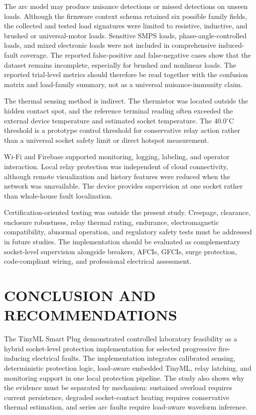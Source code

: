 \documentclass[conference,a4paper]{template/IEEEtran}
\begin{document}
The arc model may produce nuisance detections or missed detections on
unseen loads. Although the firmware context schema retained six possible
family fields, the collected and tested load signatures were limited to
resistive, inductive, and brushed or universal-motor loads. Sensitive
SMPS loads, phase-angle-controlled loads, and mixed electronic loads were
not included in comprehensive induced-fault coverage. The reported
false-positive and false-negative cases show that the dataset remains incomplete,
especially for brushed and nonlinear loads. The reported trial-level
metrics should therefore be read together with the confusion matrix and
load-family summary, not as a universal nuisance-immunity claim.

The thermal sensing method is indirect. The thermistor was located
outside the hidden contact spot, and the reference terminal reading often
exceeded the external device temperature and estimated socket
temperature. The 40.0$^{\circ}$C threshold is a prototype control
threshold for conservative relay action rather than a universal socket
safety limit or direct hotspot measurement.

Wi-Fi and Firebase supported monitoring, logging, labeling, and operator
interaction. Local relay protection was independent of cloud
connectivity, although remote visualization and history features were
reduced when the network was unavailable. The device provides supervision
at one socket rather than whole-house fault localization.

Certification-oriented testing was outside the present study. Creepage,
clearance, enclosure robustness, relay thermal rating, endurance,
electromagnetic compatibility, abnormal operation, and regulatory safety
tests must be addressed in future studies. The implementation should be
evaluated as
complementary socket-level supervision alongside breakers, AFCIs, GFCIs,
surge protection, code-compliant wiring, and professional electrical
assessment.

\section{CONCLUSION AND RECOMMENDATIONS}

The TinyML Smart Plug demonstrated controlled laboratory feasibility as a
hybrid socket-level protection implementation for selected progressive
fire-inducing electrical faults. The implementation integrates calibrated
sensing, deterministic protection logic, load-aware embedded
TinyML, relay latching, and monitoring support in one local protection
pipeline. The study also shows why the evidence must be
separated by mechanism: sustained overload requires current persistence,
degraded socket-contact heating requires conservative thermal estimation, and
series arc faults require load-aware waveform inference.
\end{document}
